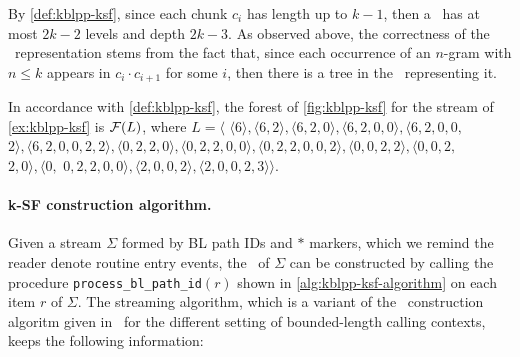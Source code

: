 \noindent By \mydefinition\ref{def:kblpp-ksf}, since each chunk $c_i$ has length up to $k-1$, then a \ksf\ has at most $2k-2$ levels and depth $2k-3$. As observed above, the correctness of the \ksf\ representation stems from the fact that, since each occurrence of an $n$-gram with $n\le k$ appears in $c_i\cdot c_{i+1}$ for some $i$, then there is a tree in the \ksf\ representing it.

\begin{example} In accordance with \mydefinition\ref{def:kblpp-ksf}, the forest of \myfigure\ref{fig:kblpp-ksf} for the stream of \myexample\ref{ex:kblpp-ksf} is ${\cal F}(L)$, where $L=\langle$ $
\langle 6\rangle, 
\langle 6, 2\rangle, 
\langle 6, 2, 0\rangle, 
\langle 6, 2, 0, 0\rangle, 
\langle 6, 2, 0, 0,$
$
2\rangle,
\langle 6, 2, 0, 0, 2, 2\rangle,
\langle 0, 2, 2, 0\rangle, 
\langle 0, 2, 2, 0, 0\rangle, 
\langle 0, 2, 2, 0, 0, 2\rangle,
\langle 0, 0, 2, 2\rangle,
\langle 0, 0,2,$ $2, 0\rangle,
\langle 0,$
$
0, 2, 2, 0, 0\rangle,
\langle 2, 0, 0, 2\rangle,
\langle 2, 0, 0, 2, 3\rangle
\rangle$.
\end{example}

\paragraph*{k-SF construction algorithm.} Given a stream $\Sigma$ formed by BL path IDs and $*$ markers, which we remind the reader denote routine entry events, the \ksf\ of $\Sigma$ can be constructed by calling the procedure {\tt process\_bl\_path\_id}$(r)$ shown in \myalgorithm\ref{alg:kblpp-ksf-algorithm} on each item $r$ of $\Sigma$. The streaming algorithm, which is a variant of the \ksf\ construction algoritm given in~\cite{Ausiello12} for the different setting of bounded-length calling contexts, keeps the following information:

